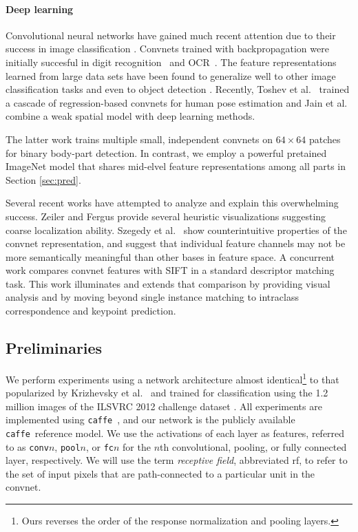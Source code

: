 \documentclass{article} %
\newcommand{\caffe}{\texttt{caffe}}
\begin{document}
\paragraph{Deep learning}
Convolutional neural networks have gained much recent attention due to their
success in image classification \cite{Krizhevsky}. Convnets trained with
backpropagation were initially
succesful in digit recognition~\cite{Lecun89} and OCR~\cite{Lecun98OCR}.
The feature representations learned from large data
sets have been found to generalize well to other image classification tasks
\cite{decaf} and even to object detection \cite{RossJeff, sermanet-cvpr13}.
Recently, Toshev et al.\ \cite{deep_pose} trained a cascade of regression-based
convnets for human pose estimation and Jain et al.\ \cite{HumanPoseICLR} combine
a weak spatial model with deep learning methods.

The latter work trains multiple small, independent convnets on $64 \times 64$ patches
for binary body-part detection. In contrast, we employ a powerful pretained
ImageNet model that shares mid-elvel feature representations among all parts
in Section \ref{sec:pred}.

Several recent works have attempted to analyze and explain this overwhelming
success. Zeiler and Fergus \cite{ZF} provide several heuristic visualizations
suggesting coarse localization ability.
Szegedy et al.\ \cite{Szegedy} show
counterintuitive properties of the convnet representation, and suggest that
individual feature channels may not be more semantically meaningful than other
bases in feature space.
A concurrent work \cite{Fischer}
compares convnet features with SIFT in a standard descriptor matching task.
This work illuminates and extends that comparison by providing visual analysis
and by moving beyond single instance matching to intraclass correspondence and keypoint prediction.

\subsection{Preliminaries}

We perform experiments using a network architecture almost
identical\footnote{Ours reverses the order of the response normalization and
pooling layers.} to that popularized by Krizhevsky et
al.\ \cite{Krizhevsky} and trained for classification using the 1.2 million
images of the ILSVRC 2012 challenge dataset \cite{ImageNet}.
All experiments are implemented using \caffe\ \cite{caffe}, and our network is
the publicly available \caffe\ reference model.
We use the activations of each layer as features, referred to as
\texttt{conv}$n$, \texttt{pool}$n$, or \texttt{fc}$n$ for the $n$th convolutional,
pooling, or fully connected layer, respectively.
We will use the term \emph{receptive field}, abbreviated rf, to refer to the
set of input pixels that are path-connected to a particular unit in the convnet.
\end{document}
